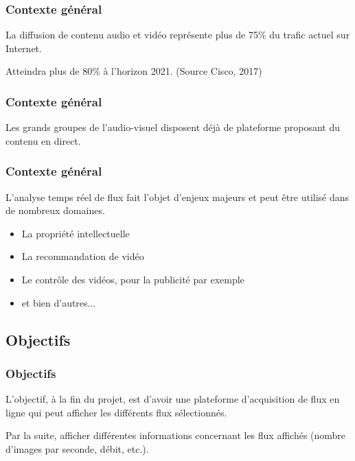 \documentclass{beamer}
\begin{document}
\begin{frame}	

\frametitle{Contexte général}

La diffusion de contenu audio et vidéo représente plus de 75\% du trafic actuel sur Internet.

Atteindra plus de 80\% à l'horizon 2021. (Source Cisco, 2017)

\end{frame}

\begin{frame}	

\frametitle{Contexte général}

Les grands groupes de l'audio-visuel disposent déjà de plateforme proposant du contenu en direct.


\end{frame}


\begin{frame}	

\frametitle{Contexte général}

L'analyse temps réel de flux fait l'objet d'enjeux majeurs et peut être utilisé dans de nombreux domaines.

\begin{itemize}
	\item La propriété intellectuelle
	\item La recommandation de vidéo
	\item Le contrôle des vidéos, pour la publicité par exemple
	\item et bien d'autres...
\end{itemize}

\end{frame}


\subsection{Objectifs}

\begin{frame}	

\frametitle{Objectifs}

L'objectif, à la fin du projet, est d'avoir une plateforme d'acquisition de flux en ligne qui peut afficher les différents flux sélectionnés.

Par la suite, afficher différentes informations concernant les flux affichés (nombre d'images par seconde, débit, etc.).


\end{frame}
\end{document}

